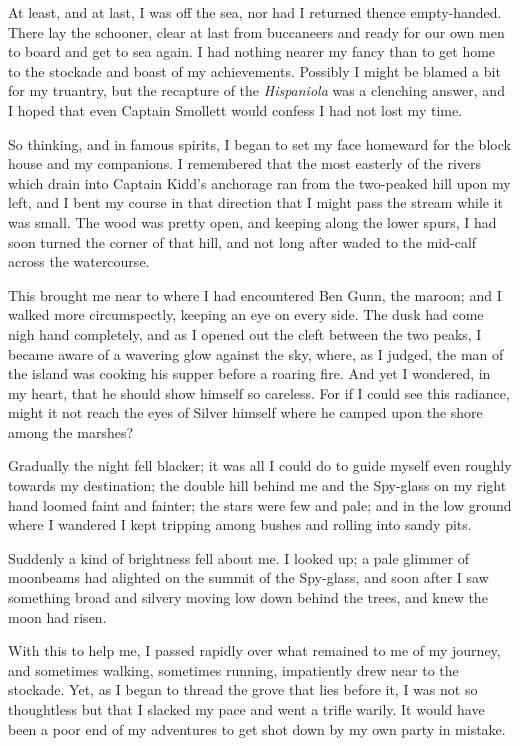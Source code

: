 At least, and at last, I was off the sea, nor had I returned thence empty-handed. There lay the schooner, clear at last from buccaneers and ready for our own men to board and get to sea again. I had nothing nearer my fancy than to get home to the stockade and boast of my achievements. Possibly I might be blamed a bit for my truantry, but the recapture of the \textit{Hispaniola} was a clenching answer, and I hoped that even Captain Smollett would confess I had not lost my time.

So thinking, and in famous spirits, I began to set my face homeward for the block house and my companions. I remembered that the most easterly of the rivers which drain into Captain Kidd’s anchorage ran from the two-peaked hill upon my left, and I bent my course in that direction that I might pass the stream while it was small. The wood was pretty open, and keeping along the lower spurs, I had soon turned the corner of that hill, and not long after waded to the mid-calf across the watercourse.

This brought me near to where I had encountered Ben Gunn, the maroon; and I walked more circumspectly, keeping an eye on every side. The dusk had come nigh hand completely, and as I opened out the cleft between the two peaks, I became aware of a wavering glow against the sky, where, as I judged, the man of the island was cooking his supper before a roaring fire. And yet I wondered, in my heart, that he should show himself so careless. For if I could see this radiance, might it not reach the eyes of Silver himself where he camped upon the shore among the marshes?

Gradually the night fell blacker; it was all I could do to guide myself even roughly towards my destination; the double hill behind me and the Spy-glass on my right hand loomed faint and fainter; the stars were few and pale; and in the low ground where I wandered I kept tripping among bushes and rolling into sandy pits.

Suddenly a kind of brightness fell about me. I looked up; a pale glimmer of moonbeams had alighted on the summit of the Spy-glass, and soon after I saw something broad and silvery moving low down behind the trees, and knew the moon had risen.

With this to help me, I passed rapidly over what remained to me of my journey, and sometimes walking, sometimes running, impatiently drew near to the stockade. Yet, as I began to thread the grove that lies before it, I was not so thoughtless but that I slacked my pace and went a trifle warily. It would have been a poor end of my adventures to get shot down by my own party in mistake.

